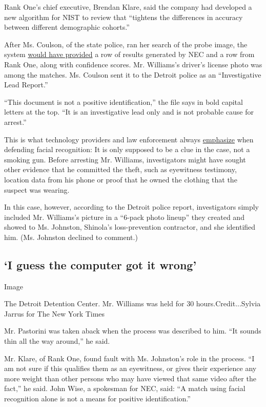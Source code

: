 Rank One's chief executive, Brendan Klare, said the company had
developed a new algorithm for NIST to review that ``tightens the
differences in accuracy between different demographic cohorts.''

After Ms. Coulson, of the state police, ran her search of the probe
image, the system
\href{https://www.michigan.gov/documents/msp/Facial_Recognition_FAQ_666807_7.pdf}{would
have provided} a row of results generated by NEC and a row from Rank
One, along with confidence scores. Mr. Williams's driver's license photo
was among the matches. Ms. Coulson sent it to the Detroit police as an
``Investigative Lead Report.''

``This document is not a positive identification,'' the file says in
bold capital letters at the top. ``It is an investigative lead only and
is not probable cause for arrest.''

This is what technology providers and law enforcement always
\href{https://www.nytimes.com/2019/07/08/us/detroit-facial-recognition-cameras.html}{emphasize}
when defending facial recognition: It is only supposed to be a clue in
the case, not a smoking gun. Before arresting Mr. Williams,
investigators might have sought other evidence that he committed the
theft, such as eyewitness testimony, location data from his phone or
proof that he owned the clothing that the suspect was wearing.

In this case, however, according to the Detroit police report,
investigators simply included Mr. Williams's picture in a ``6-pack photo
lineup'' they created and showed to Ms. Johnston, Shinola's
loss-prevention contractor, and she identified him. (Ms. Johnston
declined to comment.)

\hypertarget{i-guess-the-computer-got-it-wrong}{%
\subsection{`I guess the computer got it
wrong'}\label{i-guess-the-computer-got-it-wrong}}

Image

The Detroit Detention Center. Mr. Williams was held for 30
hours.Credit...Sylvia Jarrus for The New York Times

Mr. Pastorini was taken aback when the process was described to him.
``It sounds thin all the way around,'' he said.

Mr. Klare, of Rank One, found fault with Ms. Johnston's role in the
process. ``I am not sure if this qualifies them as an eyewitness, or
gives their experience any more weight than other persons who may have
viewed that same video after the fact,'' he said. John Wise, a spokesman
for NEC, said: ``A match using facial recognition alone is not a means
for positive identification.''

